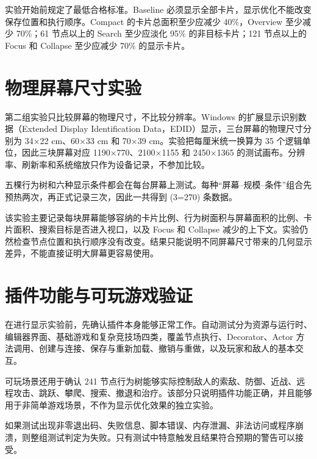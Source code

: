 实验开始前规定了最低合格标准。Baseline 必须显示全部卡片，显示优化不能改变保存位置和执行顺序。Compact 的卡片总面积至少应减少 40\%，Overview 至少减少 70\%；61 节点以上的 Search 至少应淡化 95\% 的非目标卡片；121 节点以上的 Focus 和 Collapse 至少应减少 70\% 的显示卡片。

\section{物理屏幕尺寸实验}

第二组实验只比较屏幕的物理尺寸，不比较分辨率。Windows 的扩展显示识别数据（Extended Display Identification Data，EDID）显示，三台屏幕的物理尺寸分别为 34×22 cm、60×33 cm 和 70×39 cm。实验把每厘米统一换算为 35 个逻辑单位，因此三块屏幕对应 1190×770、2100×1155 和 2450×1365 的测试画布。分辨率、刷新率和系统缩放只作为设备记录，不参加比较。

五棵行为树和六种显示条件都会在每台屏幕上测试。每种“屏幕--规模--条件”组合先预热两次，再正式记录三次，因此一共得到 (3=270) 条数据。

该实验主要记录每块屏幕能够容纳的卡片比例、行为树面积与屏幕面积的比例、卡片面积、搜索目标是否进入视口，以及 Focus 和 Collapse 减少的上下文。实验仍然检查节点位置和执行顺序没有改变。结果只能说明不同屏幕尺寸带来的几何显示差异，不能直接证明大屏幕更容易使用。

\section{插件功能与可玩游戏验证}

在进行显示实验前，先确认插件本身能够正常工作。自动测试分为资源与运行时、编辑器界面、基础游戏和复杂竞技场四类，覆盖节点执行、Decorator、Actor 方法调用、创建与连接、保存与重新加载、撤销与重做，以及玩家和敌人的基本交互。

可玩场景还用于确认 241 节点行为树能够实际控制敌人的索敌、防御、近战、远程攻击、跳跃、攀爬、搜索、撤退和治疗。该部分只说明插件功能正确，并且能够用于非简单游戏场景，不作为显示优化效果的独立实验。

如果测试出现非零退出码、失败信息、脚本错误、内存泄漏、非法访问或程序崩溃，则整组测试判定为失败。只有测试中特意触发且结果符合预期的警告可以接受。
